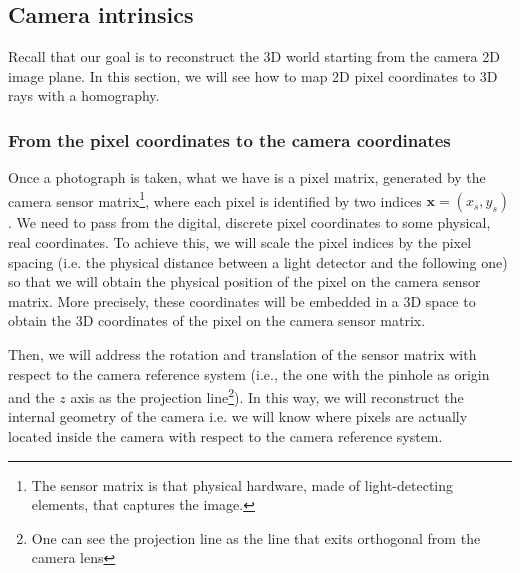 \subsection{Camera intrinsics}
Recall that our goal is to reconstruct the 3D world starting from the camera 2D image plane.
In this section, we will see how to map 2D pixel coordinates to 3D rays with a homography.

\subsubsection{From the pixel coordinates to the camera coordinates}
Once a photograph is taken, what we have is a pixel matrix, generated by the camera sensor matrix\footnote{The sensor matrix is that physical hardware, made of light-detecting elements, that captures the image.}, where each pixel is identified by two indices $\mathbf{x}=(x_{s},y_{s})$.
We need to pass from the digital, discrete pixel coordinates to some physical, real coordinates.
To achieve this, we will scale the pixel indices by the pixel spacing (i.e. the physical distance between a light detector and the following one) so that we will obtain the physical position of the pixel on the camera sensor matrix. More precisely, these coordinates will be embedded in a 3D space to obtain the 3D coordinates of the pixel on the camera sensor matrix.

Then, we will address the rotation and translation of the sensor matrix with respect to the camera reference system (i.e., the one with the pinhole as origin and the $z$ axis as the projection line\footnote{One can see the projection line as the line that exits orthogonal from the camera lens}).
In this way, we will reconstruct the internal geometry of the camera i.e. we will know where pixels are actually located inside the camera with respect to the camera reference system.

